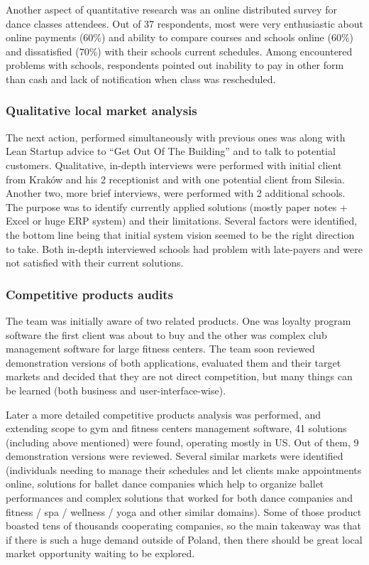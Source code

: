 \documentclass{article}
\begin{document}
Another aspect of quantitative research was an online distributed survey for dance classes attendees. Out of 37 respondents, most were very enthusiastic about online payments (60\%) and ability to compare courses and schools online (60\%) and dissatisfied (70\%) with their schools current schedules. Among encountered problems with schools, respondents pointed out inability to pay in other form than cash and lack of notification when class was rescheduled.

\subsubsection{Qualitative local market analysis}
The next action, performed simultaneously with previous ones was along with Lean Startup advice to ``Get Out Of The Building'' and to talk to potential customers. Qualitative, in-depth interviews were performed with initial client from Kraków and his 2 receptionist and with one potential client from Silesia. Another two, more brief interviews, were performed with 2 additional schools. The purpose was to identify currently applied solutions (mostly paper notes + Excel or huge ERP system) and their limitations. Several factors were identified, the bottom line being that initial system vision seemed to be the right direction to take. Both in-depth interviewed schools had problem with late-payers and were not satisfied with their current solutions.

\subsubsection{Competitive products audits}
The team was initially aware of two related products. One was loyalty program software the first client was about to buy and the other was complex club management software for large fitness centers. The team soon reviewed demonstration versions of both applications, evaluated them and their target markets and decided that they are not direct competition, but many things can be learned (both business and user-interface-wise).

Later a more detailed competitive products analysis was performed, and extending scope to gym and fitness centers management software, 41 solutions (including above mentioned) were found, operating mostly in US. Out of them, 9 demonstration versions were reviewed. Several similar markets were identified (individuals needing to manage their schedules and let clients make appointments online, solutions for ballet dance companies which help to organize ballet performances and complex solutions that worked for both dance companies and fitness / spa / wellness / yoga and other similar domains). Some of those product boasted tens of thousands cooperating companies, so the main takeaway was that if there is such a huge demand outside of Poland, then there should be great local market opportunity waiting to be explored.
\end{document}
